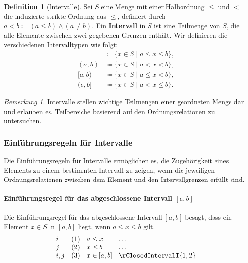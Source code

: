 \documentclass{book}
\theoremstyle{plain}
\theoremstyle{remark}
\newtheorem*{remark}{Bemerkung}
\theoremstyle{definition}
\newtheorem{definition}{Definition}[section]
\begin{document}
\begin{definition}[Intervalle]
    Sei \(S\) eine Menge mit einer Halbordnung \(\leq\) und \(<\) die induzierte strikte Ordnung aus \(\leq\), definiert durch \( a < b \coloneqq (a \leq b) \land (a \neq b) \). Ein \textbf{Intervall} in \(S\) ist eine Teilmenge von \(S\), die alle Elemente zwischen zwei gegebenen Grenzen enthält. Wir definieren die verschiedenen Intervalltypen wie folgt:
    \begin{align*}
        [a, b] &\coloneqq \{ x \in S \mid a \leq x \leq b \}, \\
        (a, b) &\coloneqq \{ x \in S \mid a < x < b \}, \\
        [a, b) &\coloneqq \{ x \in S \mid a \leq x < b \}, \\
        (a, b] &\coloneqq \{ x \in S \mid a < x \leq b \}.
    \end{align*}
\end{definition}

\begin{remark}
    Intervalle stellen wichtige Teilmengen einer geordneten Menge dar und erlauben es, Teilbereiche basierend auf den Ordnungsrelationen zu untersuchen.
\end{remark}

\subsubsection{Einführungsregeln für Intervalle}
\label{rule:rClosedIntervalI} \label{rule:rOpenIntervalI} \label{rule:rClosedOpenIntervalI} \label{rule:rOpenClosedIntervalI}

Die Einführungsregeln für Intervalle ermöglichen es, die Zugehörigkeit eines Elements zu einem bestimmten Intervall zu zeigen, wenn die jeweiligen Ordnungsrelationen zwischen dem Element und den Intervallgrenzen erfüllt sind.

\paragraph{Einführungsregel für das abgeschlossene Intervall \([a, b]\)}
Die Einführungsregel für das abgeschlossene Intervall \([a, b]\) besagt, dass ein Element \(x \in S\) in \([a, b]\) liegt, wenn \(a \leq x \leq b\) gilt.
\[
\begin{array}{llll}
    i   & (1) & a \leq x & \dots \\
    j   & (2) & x \leq b & \dots \\
    i,j & (3) & x \in [a, b] & \rClosedIntervalI{1,2}
\end{array}
\]
\end{document}
